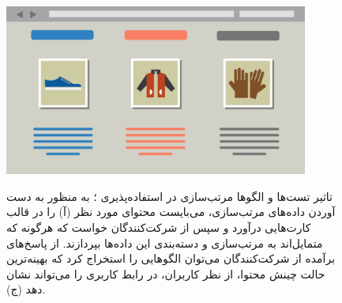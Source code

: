 \begin{figure}[H]
{		\includegraphics[width=10cm]{Resources/sort3.PNG}
	}
	\caption[تاثیر تست‌ها و الگوها مرتب‌سازی در استفاده‌پذیری]
	{تاثیر تست‌ها و الگوها مرتب‌سازی در استفاده‌پذیری
		\cite{noauthor_card_nodate}؛
		به منظور به دست آوردن داده‌های مرتب‌سازی، می‌بایست محتوای مورد نظر (آ) را در قالب کارت‌هایی درآورد  و سپس از شرکت‌کنندگان خواست که هرگونه که متمایل‌اند به مرتب‌سازی و دسته‌بندی این داده‌ها بپردازند. از پاسخ‌های برآمده از شرکت‌کنندگان می‌توان الگوهایی را استخراج کرد که بهینه‌ترین حالت چینش محتوا، از نظر کاربران، در رابط کاربری را می‌تواند نشان دهد (ج).
	}
	\label{fig:sorting}
\end{figure}
